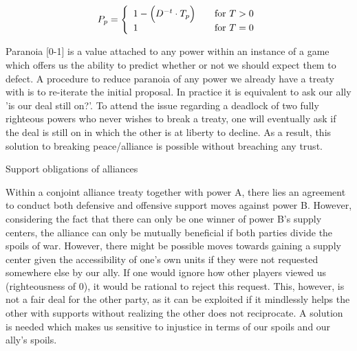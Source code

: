 \documentclass[a4paper]{article} %
\begin{document}
  \[ P_p = \left\{ 
  \begin{array}{l l}
    1 - \Big( D^{-t} \cdot T_p \Big) & \quad \text{for $T > 0$} \\
 	1 & \quad \text{for $T = 0$}
    
  \end{array} \right.\]
  
  \begin{center}
\end{center}


Paranoia [0-1]  is a value attached to any power within an instance of a game which offers us the ability to predict whether or not we should expect them to defect. A procedure to reduce paranoia of any power we already have a treaty with is to re-iterate the initial proposal. In practice it is equivalent to ask our ally 'is our deal still on?'. To attend the issue regarding a deadlock of two fully righteous powers who never wishes to break a treaty, one will eventually ask if the deal is still on in which the other is at liberty to decline. As a result, this solution to breaking peace/alliance is possible without breaching any trust.


Support obligations of alliances

Within a conjoint alliance treaty together with power A, there lies an agreement to conduct both defensive and offensive support moves against power B. However, considering the fact that there can only be one winner of power B’s supply centers, the alliance can only be mutually beneficial if both parties divide the spoils of war. However, there might be possible moves towards gaining a supply center given the accessibility of one's own units if they were not requested somewhere else by our ally. If one would ignore how other players viewed us (righteousness of 0), it would be rational to reject this request. This, however, is not a fair deal for the other party, as it can be exploited if it mindlessly helps the other with supports without realizing the other does not reciprocate. A solution is needed which makes us sensitive to injustice in terms of our spoils and our ally's spoils.
\end{document}
